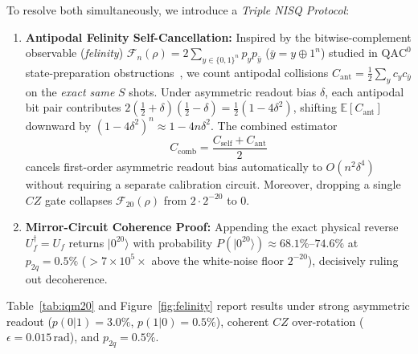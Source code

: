 \documentclass[11pt,a4paper]{article}
\newcommand{\ket}[1]{|#1\rangle}
\begin{document}
To resolve both simultaneously, we introduce a \emph{Triple NISQ Protocol}:
\begin{enumerate}
  \item \textbf{Antipodal Felinity Self-Cancellation:} Inspired by the bitwise-complement observable (\emph{felinity}) $\mathcal{F}_n(\rho) = 2\sum_{y\in\{0,1\}^n} p_y p_{\bar y}$ ($\bar y = y \oplus 1^n$) studied in $\mathrm{QAC}^0$ state-preparation obstructions~\cite{OpenAI2026QAC0}, we count antipodal collisions $C_{\mathrm{ant}} = \frac{1}{2}\sum_y c_y c_{\bar y}$ on the \emph{exact same} $S$ shots. Under asymmetric readout bias $\delta$, each antipodal bit pair contributes $2(\tfrac{1}{2}+\delta)(\tfrac{1}{2}-\delta) = \tfrac{1}{2}(1-4\delta^2)$, shifting $\mathbb{E}[C_{\mathrm{ant}}]$ downward by $(1-4\delta^2)^n \approx 1 - 4n\delta^2$. The combined estimator
  \[
    C_{\mathrm{comb}} = \frac{C_{\mathrm{self}} + C_{\mathrm{ant}}}{2}
  \]
  cancels first-order asymmetric readout bias automatically to $O(n^2\delta^4)$ without requiring a separate calibration circuit. Moreover, dropping a single $CZ$ gate collapses $\mathcal{F}_{20}(\rho)$ from $2\cdot 2^{-20}$ to $0$.
  \item \textbf{Mirror-Circuit Coherence Proof:} Appending the exact physical reverse $U_f^\dagger = U_f$ returns $\ket{0^{20}}$ with probability $P(\ket{0^{20}}) \approx 68.1\%$--$74.6\%$ at $p_{2q}=0.5\%$ ($>7\times 10^5\times$ above the white-noise floor $2^{-20}$), decisively ruling out decoherence.
\end{enumerate}

Table~\ref{tab:iqm20} and Figure~\ref{fig:felinity} report results under strong asymmetric readout ($p(0|1)=3.0\%$, $p(1|0)=0.5\%$), coherent $CZ$ over-rotation ($\epsilon = 0.015\,\text{rad}$), and $p_{2q}=0.5\%$.
\end{document}
